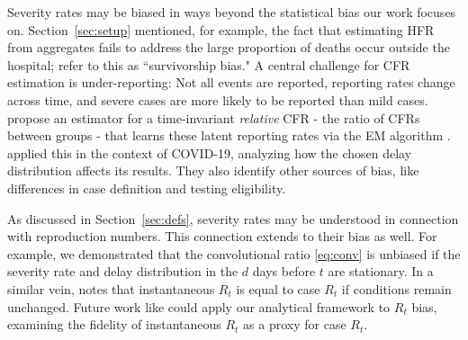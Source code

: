 \documentclass{article}
\begin{document}
Severity rates may be biased in ways beyond the statistical bias our work focuses on. Section~\ref{sec:setup} mentioned, for example, the fact that estimating HFR from aggregates fails to address the large proportion of deaths occur outside the hospital; \citet{lipsitch2015potential} refer to this as ``survivorship bias." A central challenge for CFR estimation is under-reporting: Not all events are reported, reporting rates change across time, and severe cases are more likely to be reported than mild cases. \citet{reich2012estimating} propose an estimator for a time-invariant \textit{relative} CFR - the ratio of CFRs between groups - that learns these latent reporting rates via the EM algorithm \citep{EM}. \citet{anastasios} applied this in the context of COVID-19, analyzing how the chosen delay distribution affects its results. They also identify other sources of bias, like differences in case definition and testing eligibility.


As discussed in Section~\ref{sec:defs}, severity rates may be understood in connection with reproduction numbers. This connection extends to their bias as well. For example, we  demonstrated that the convolutional ratio \eqref{eq:conv} is unbiased if the severity rate and delay distribution in the $d$ days before $t$ are stationary. In a similar vein, \citet{fraser2007} notes that instantaneous $R_t$ is equal to case $R_t$ if conditions remain unchanged. 
Future work like \citet{rt_study} could apply our analytical framework to $R_t$ bias, examining the fidelity of instantaneous $R_t$ as a proxy for case $R_t$. 




\end{document}
